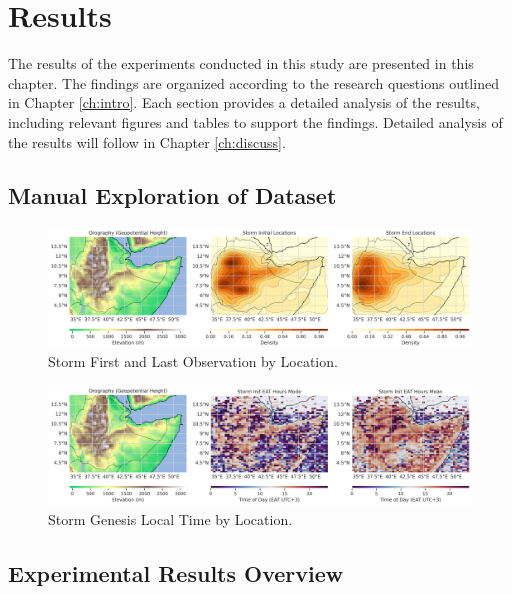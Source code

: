 \chapter{Results}
\label{ch:results}

The results of the experiments conducted in this study are presented in this chapter. The findings are organized according to the research questions outlined in Chapter \ref{ch:intro}. Each section provides a detailed analysis of the results, including relevant figures and tables to support the findings. Detailed analysis of the results will follow in Chapter \ref{ch:discuss}.

\section{Manual Exploration of Dataset}

\begin{figure}[h]
    \centering
    \includegraphics[width=\textwidth]{../figures/generated/orography_storm_init_end_kde.png}
    \caption{Storm First and Last Observation by Location.}
    \label{fig:orography_storm_init_end_kde}
\end{figure}

\begin{figure}[h]
    \centering
    \includegraphics[width=\textwidth]{../figures/generated/orography_storm_init_eat_hours_mode_mean.png}
    \caption{Storm Genesis Local Time by Location.}
    \label{fig:orography_storm_init_eat_hours_mode_mean}
\end{figure}

\section{Experimental Results Overview}

